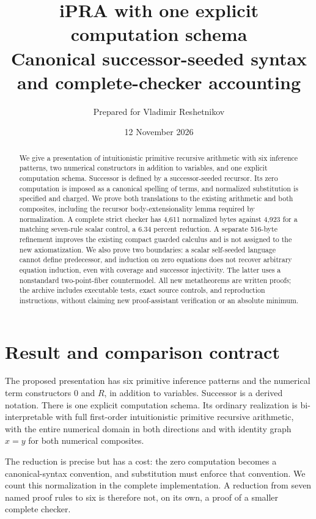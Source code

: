 \documentclass[11pt]{article}
\title{\textbf{iPRA with one explicit computation schema}\\[0.4em]
\large Canonical successor-seeded syntax and complete-checker accounting}
\author{Prepared for Vladimir Reshetnikov}
\date{12 November 2026}
\theoremstyle{definition}
\begin{document}
\maketitle
\begin{abstract}
We give a presentation of intuitionistic primitive recursive arithmetic with
six inference patterns, two numerical constructors in addition to variables,
and one explicit computation schema. Successor is defined by a
successor-seeded recursor. Its zero computation is imposed as a canonical
spelling of terms, and normalized substitution is specified and charged.
We prove both translations to the existing arithmetic and both composites,
including the recursor body-extensionality lemma required by normalization.
A complete strict checker has 4,611 normalized bytes against 4,923 for a
matching seven-rule scalar control, a 6.34 percent reduction. A separate
516-byte refinement improves the existing compact guarded calculus and is
not assigned to the new axiomatization. We also prove two boundaries: a
scalar self-seeded language cannot define predecessor, and induction on
zero equations does not recover arbitrary equation induction, even with
coverage and successor injectivity. The latter uses a nonstandard
two-point-fiber countermodel. All new metatheorems are written proofs;
the archive includes executable tests, exact source controls, and
reproduction instructions, without claiming new proof-assistant verification
or an absolute minimum.
\end{abstract}
\clearpage
\tableofcontents
\newpage


\section{Result and comparison contract}
\label{sec:assessment}

The proposed presentation has six primitive inference patterns and the
numerical term constructors $0$ and $R$, in addition to variables. Successor
is a derived notation. There is one explicit computation schema. Its
ordinary realization is bi-interpretable with full first-order intuitionistic
primitive recursive arithmetic, with the entire numerical domain in both
directions and with identity graph $x=y$ for both numerical composites.

The reduction is precise but has a cost: the zero computation becomes a
canonical-syntax convention, and substitution must enforce that convention.
We count this normalization in the complete implementation. A reduction from
seven named proof rules to six is therefore not, on its own, a proof of a
smaller complete checker.
\end{document}
